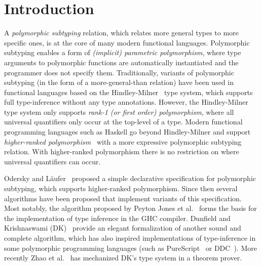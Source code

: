 \section{Introduction}

A \emph{polymorphic subtyping} relation, which relates more general
types to more specific ones, is at the core of many modern functional
languages. Polymorphic subtyping enables a form of
\emph{(implicit) parametric polymorphism}, where type arguments to polymorphic
functions are automatically instantiated and the programmer does not specify them.
Traditionally, variants of polymorphic subtyping (in the form of a more-general-than relation)
have been used in functional languages based on the
Hindley-Milner~\cite{hindley1969principal,milner1978theory,damas1982principal}
type system, which supports full type-inference without any type annotations.
However, the Hindley-Milner type system only supports \emph{rank-1 (or first order)
polymorphism}, where all universal quantifiers only occur at the top-level
of a type.  Modern functional programming languages such as Haskell go beyond
Hindley-Milner and support \emph{higher-ranked polymorphism}~\cite{odersky1996putting,jones2007practical}
with a more expressive
polymorphic subtyping relation. With higher-ranked
polymorphism there is no restriction on where universal quantifiers can occur.

Odersky and L\"aufer~\cite{odersky1996putting} proposed a
simple declarative specification for polymorphic subtyping, which supports higher-ranked polymorphism.
Since then several
algorithms have been proposed that implement variants of this specification. Most
notably, the algorithm proposed by Peyton Jones et al.~\cite{jones2007practical} forms the basis
for the implementation of type inference in the GHC compiler.
Dunfield and Krishnaswami (DK)~\cite{dunfield2013complete} provide an elegant
formalization of another sound and complete algorithm, which has
also inspired implementations of type-inference in some polymorphic
programming languages (such as PureScript~\cite{PureScript} or DDC~\cite{Disciple}).
More recently Zhao et al.~\cite{zhao19mechanical} has mechanized DK's type system in a theorem prover.


